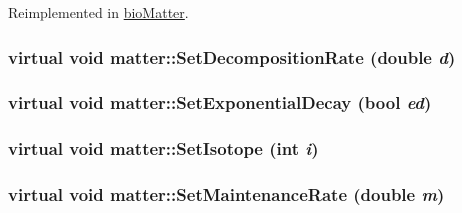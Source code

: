 Reimplemented in \hyperlink{classbio_matter_a506d0acd5dfdf32d7742b90961c1cf6d}{bioMatter}.\hypertarget{classmatter_aea177bcb159721bb1d4fe4bc8b5ec451}{
\subsubsection[{SetDecompositionRate}]{\setlength{\rightskip}{0pt plus 5cm}virtual void matter::SetDecompositionRate (double {\em d})}}
\label{classmatter_aea177bcb159721bb1d4fe4bc8b5ec451}
\hypertarget{classmatter_a211b0d822211f4f202803e72b902db0f}{
\subsubsection[{SetExponentialDecay}]{\setlength{\rightskip}{0pt plus 5cm}virtual void matter::SetExponentialDecay (bool {\em ed})}}
\label{classmatter_a211b0d822211f4f202803e72b902db0f}
\hypertarget{classmatter_a56ffe81f49ab5d79f47cc71ece13a48a}{
\subsubsection[{SetIsotope}]{\setlength{\rightskip}{0pt plus 5cm}virtual void matter::SetIsotope (int {\em i})}}
\label{classmatter_a56ffe81f49ab5d79f47cc71ece13a48a}
\hypertarget{classmatter_aa6ecf5e0a7bf435208005c087e2f5afa}{
\subsubsection[{SetMaintenanceRate}]{\setlength{\rightskip}{0pt plus 5cm}virtual void matter::SetMaintenanceRate (double {\em m})}}
\label{classmatter_aa6ecf5e0a7bf435208005c087e2f5afa}


